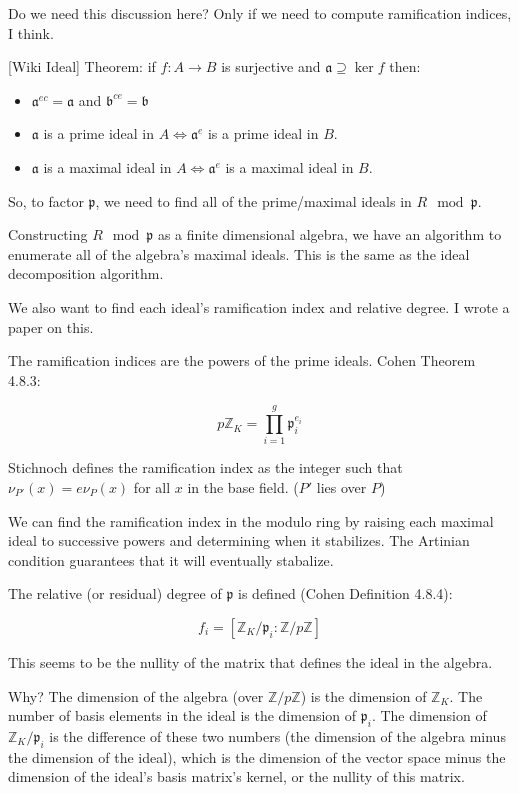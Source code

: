 \begin{mdframed}[backgroundcolor=cyan!20]
Do we need this discussion here?  Only if we need to compute ramification indices, I think.

[Wiki Ideal] Theorem: if $f: A \to B$ is surjective and $ \mathfrak {a}\supseteq \ker f$ then:

\begin{itemize}
\item $\mathfrak {a}^{ec}={\mathfrak {a}}$ and ${\mathfrak {b}}^{ce}={\mathfrak {b}}$
\item ${\mathfrak {a}}$ is a prime ideal in $A \Leftrightarrow {\mathfrak  {a}}^{e}$ is a prime ideal in $B$.
\item ${\mathfrak {a}}$ is a maximal ideal in $A \Leftrightarrow  {\mathfrak  {a}}^{e}$ is a maximal ideal in $B$.
\end{itemize}

So, to factor $\mathfrak{p}$, we need to find all of the prime/maximal ideals
in $R \mod \mathfrak{p}$.

Constructing $R \mod \mathfrak{p}$ as a finite dimensional algebra,
we have an algorithm to enumerate all of the algebra's maximal ideals.
This is the same as the ideal decomposition algorithm.

We also want to find each ideal's ramification index and relative degree.
I wrote a paper on this.

The ramification indices are the powers of the prime ideals.  Cohen Theorem 4.8.3:

$$p {\mathbb Z}_K = \prod_{i=1}^{g} {\mathfrak p}_i^{e_i}$$

Stichnoch defines the ramification index as the integer such
that $\nu_{P'}(x) = e \nu_P(x)$ for all $x$ in the base field.
($P'$ lies over $P$)

We can find the ramification index in the modulo ring by raising each maximal
ideal to successive powers and determining when it stabilizes.  The Artinian
condition guarantees that it will eventually stabalize.

The relative (or residual) degree of ${\mathfrak p}$ is defined (Cohen Definition 4.8.4):

$$f_i = [{\mathbb Z}_K/{\mathfrak p}_i : {\mathbb Z}/p{\mathbb Z}]$$

This seems to be the nullity of the matrix that defines the ideal in the algebra.

Why?  The dimension of the algebra (over ${\mathbb Z}/p{\mathbb Z}$)
is the dimension of ${\mathbb Z}_K$.  The number of basis elements in
the ideal is the dimension of ${\mathfrak p}_i$.  The dimension of
${\mathbb Z}_K/{\mathfrak p}_i$ is the difference of these two numbers
(the dimension of the algebra minus the dimension of the ideal), which
is the dimension of the vector space minus the dimension of the
ideal's basis matrix's kernel, or the nullity of this matrix.
\end{mdframed}


